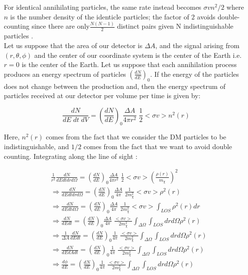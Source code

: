 \documentclass[12pt]{report}
\begin{document}
For identical annihilating particles, the same rate instead becomes $\sigma v n^2/2$ where $n$ is the number density of the identicle particles; the factor of $2$ avoids double-counting since there are only$\frac{N(N-1)}{2} $ distinct pairs given N indistinguishable particles \cite{tasilecture}.\\

Let us suppose that the area of our detector is $\Delta A$, and the signal arising from $(r,\theta, \phi)$ and the center of our coordinate system is the center of the Earth i.e. $r=0$ is the center of the Earth. Let us suppose that each annihilation process produces an energy spectrum of particles $\left(\frac{dN}{dE}\right)_0$. If the energy of the particles does not change between the production and, then the energy spectrum of particles received at our detector per volume per time is given by:





$$\frac{dN}{dE\;dt\;dV}= \left(\frac{dN}{dE}\right)_0 \frac{\Delta A}{4 \pi r^2}\; \frac{1}{2} <\sigma v> n^2(r)$$





Here, $n^2(r)$ comes from the fact that we consider the DM particles to be indistinguishable, and $1/2$ comes from the fact that we want to avoid double counting. Integrating along the line of sight \cite{tasilecture} \cite{indtools} :





\begin{align*}
& \frac{1}{r^2} \frac{dN}{dE dt dr d\Omega}=  \left(\frac{dN}{dE}\right)_0 \frac{\Delta A}{4 \pi r^2}\; \frac{1}{2} <\sigma v> \left(\frac{\rho(r)}{m_\chi} \right)^2 \\
&\Rightarrow \frac{dN}{dE dt dr d\Omega}=  \left(\frac{dN}{dE}\right)_0 \frac{\Delta A}{4 \pi}\; \frac{1}{2 m^2_\chi} <\sigma v> \rho^2(r)\\
&\Rightarrow \frac{dN}{dE dt d\Omega} = \left(\frac{dN}{dE}\right)_0 \frac{\Delta A}{4 \pi}\; \frac{1}{2 m^2_\chi} <\sigma v> \int_{LOS} \rho^2(r) dr\\
&\Rightarrow \frac{dN}{dE dt} = \left(\frac{dN}{dE}\right)_0 \frac{\Delta A}{4 \pi}\; \frac{<\sigma v> }{2 m^2_\chi} \int_{\Delta \Omega} \int_{LOS} dr d\Omega \rho^2(r)\\
&\Rightarrow \frac{1}{\Delta A} \frac{dN}{dE dt} = \left(\frac{dN}{dE}\right)_0 \frac{1}{4 \pi}\; \frac{<\sigma v> }{2 m^2_\chi} \int_{\Delta \Omega} \int_{LOS} dr d\Omega \rho^2(r)\\
&\Rightarrow  \frac{dN}{dE dA dt} = \left(\frac{dN}{dE}\right)_0 \frac{1}{4 \pi}\; \frac{<\sigma v> }{2 m^2_\chi} \int_{\Delta \Omega} \int_{LOS} dr d\Omega \rho^2(r)\\
&\Rightarrow  \frac{d\phi}{dE} = \left(\frac{dN}{dE}\right)_0 \frac{1}{4 \pi}\; \frac{<\sigma v> }{2 m^2_\chi} \int_{\Delta \Omega} \int_{LOS} dr d\Omega \rho^2(r)
\end{align*}
\end{document}
